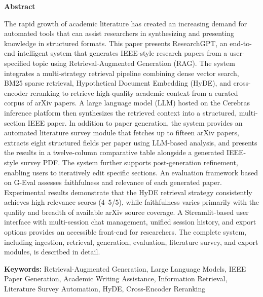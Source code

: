 \documentclass[12pt, a4paper]{article}
\begin{document}
\begin{center}
  \begin{minipage}{0.88\textwidth}
    \begin{center}{\normalsize\bfseries Abstract}\end{center}
    \vspace{0.4em}
    \small
    The rapid growth of academic literature has created an increasing demand
    for automated tools that can assist researchers in synthesizing and presenting
    knowledge in structured formats. This paper presents ResearchGPT, an end-to-end
    intelligent system that generates IEEE-style research papers from a user-specified
    topic using Retrieval-Augmented Generation (RAG). The system integrates a
    multi-strategy retrieval pipeline combining dense vector search, BM25 sparse
    retrieval, Hypothetical Document Embedding (HyDE), and cross-encoder reranking
    to retrieve high-quality academic context from a curated corpus of arXiv papers.
    A large language model (LLM) hosted on the Cerebras inference platform then
    synthesizes the retrieved context into a structured, multi-section IEEE paper.
    In addition to paper generation, the system provides an automated literature
    survey module that fetches up to fifteen arXiv papers, extracts eight structured
    fields per paper using LLM-based analysis, and presents the results in a
    twelve-column comparative table alongside a generated IEEE-style survey PDF.
    The system further supports post-generation refinement, enabling users to
    iteratively edit specific sections. An evaluation framework based on G-Eval
    assesses faithfulness and relevance of each generated paper. Experimental results
    demonstrate that the HyDE retrieval strategy consistently achieves high relevance
    scores (4--5/5), while faithfulness varies primarily with the quality and
    breadth of available arXiv source coverage. A Streamlit-based user interface
    with multi-session chat management, unified session history, and export options
    provides an accessible front-end for researchers. The complete system, including
    ingestion, retrieval, generation, evaluation, literature survey, and export
    modules, is described in detail.
  \end{minipage}
\end{center}

\vspace{0.8em}
\noindent\textbf{Keywords:} Retrieval-Augmented Generation, Large Language Models,
IEEE Paper Generation, Academic Writing Assistance, Information Retrieval,
Literature Survey Automation, HyDE, Cross-Encoder Reranking
\vspace{0.3em}
\end{document}

